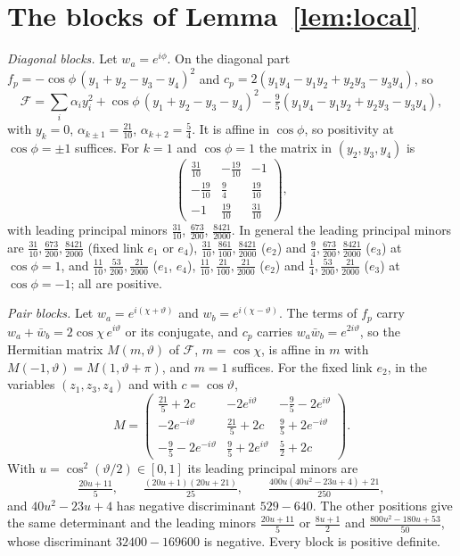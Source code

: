 \section{The blocks of Lemma~\ref{lem:local}}\label{app:blocks}

\emph{Diagonal blocks.} Let $w_a=e^{i\phi}$. On the diagonal part
$f_p=-\cos\phi\,(y_1+y_2-y_3-y_4)^2$ and $c_p=2(y_1y_4-y_1y_2+y_2y_3-y_3y_4)$, so
\[
\mathcal F=\sum_i\alpha_iy_i^2+\cos\phi\,(y_1+y_2-y_3-y_4)^2-\tfrac95(y_1y_4-y_1y_2
+y_2y_3-y_3y_4),
\]
with $y_k=0$, $\alpha_{k\pm1}=\frac{21}{10}$, $\alpha_{k+2}=\frac54$. It is affine in
$\cos\phi$, so positivity at $\cos\phi=\pm1$ suffices. For $k=1$ and $\cos\phi=1$
the matrix in $(y_2,y_3,y_4)$ is
\[
\begin{pmatrix}\frac{31}{10}&-\frac{19}{10}&-1\\[2pt]-\frac{19}{10}&\frac94&
\frac{19}{10}\\[2pt]-1&\frac{19}{10}&\frac{31}{10}\end{pmatrix},
\]
with leading principal minors $\frac{31}{10}$, $\frac{673}{200}$,
$\frac{8421}{2000}$. In general the leading principal minors are
$\frac{31}{10},\frac{673}{200},\frac{8421}{2000}$ (fixed link $e_1$ or $e_4$),
$\frac{31}{10},\frac{861}{100},\frac{8421}{2000}$ ($e_2$) and
$\frac94,\frac{673}{200},\frac{8421}{2000}$ ($e_3$) at $\cos\phi=1$, and
$\frac{11}{10},\frac{53}{200},\frac{21}{2000}$ ($e_1$, $e_4$),
$\frac{11}{10},\frac{21}{100},\frac{21}{2000}$ ($e_2$) and
$\frac14,\frac{53}{200},\frac{21}{2000}$ ($e_3$) at $\cos\phi=-1$; all are
positive.

\emph{Pair blocks.} Let $w_a=e^{i(\chi+\vartheta)}$ and $w_b=e^{i(\chi-\vartheta)}$. The
terms of $f_p$ carry $w_a+\bar w_b=2\cos\chi\,e^{i\vartheta}$ or its conjugate, and
$c_p$ carries $w_a\bar w_b=e^{2i\vartheta}$, so the Hermitian matrix $M(m,\vartheta)$ of
$\mathcal F$, $m=\cos\chi$, is affine in $m$ with $M(-1,\vartheta)=M(1,\vartheta+\pi)$,
and $m=1$ suffices. For the fixed link $e_2$, in the variables $(z_1,z_3,z_4)$
and with $c=\cos\vartheta$,
\[
M=\begin{pmatrix}\frac{21}5+2c&-2e^{i\vartheta}&-\frac95-2e^{i\vartheta}\\[2pt]
-2e^{-i\vartheta}&\frac{21}5+2c&\frac95+2e^{-i\vartheta}\\[2pt]
-\frac95-2e^{-i\vartheta}&\frac95+2e^{i\vartheta}&\frac52+2c\end{pmatrix}.
\]
With $u=\cos^2(\vartheta/2)\in[0,1]$ its leading principal minors are
\[
\tfrac{20u+11}5,\qquad\tfrac{(20u+1)(20u+21)}{25},\qquad
\tfrac{400u(40u^2-23u+4)+21}{250},
\]
and $40u^2-23u+4$ has negative discriminant $529-640$. The other positions give
the same determinant and the leading minors $\frac{20u+11}5$ or $\frac{8u+1}2$
and $\frac{800u^2-180u+53}{50}$, whose discriminant $32400-169600$ is negative.
Every block is positive definite.

